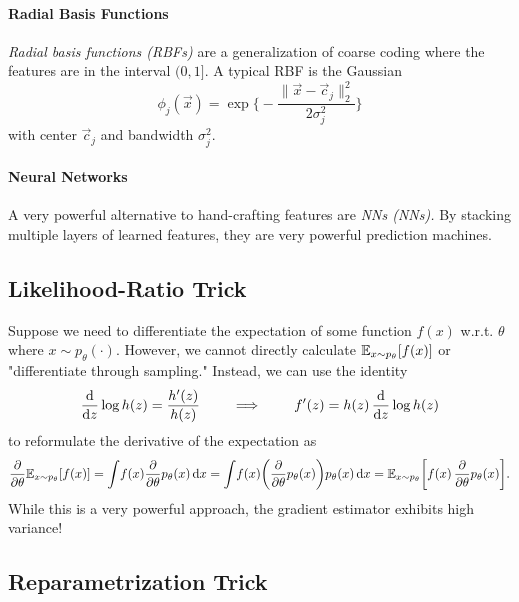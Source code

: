 			\paragraph{Radial Basis Functions}
				\emph{Radial basis functions (\acsp{RBF})} are a generalization of coarse coding where the features are in the interval \((0, 1]\). A typical \ac{RBF} is the Gaussian
				\begin{equation}
					\phi_j(\vec{x}) = \exp\Biggl\{ -\frac{\lVert \vec{x} - \vec{c}_j \rVert_2^2}{2 \sigma_j^2} \Biggr\}
				\end{equation}
				with center \(\vec{c}_j\) and bandwidth \( \sigma_j^2 \).

			\paragraph{Neural Networks}
				A very powerful alternative to hand-crafting features are \emph{\aclp{NN} (\acsp{NN}).} By stacking multiple layers of learned features, they are very powerful prediction machines.

		\subsection{Likelihood-Ratio Trick}
			\label{subsec:likelihoodRatio}

			Suppose we need to differentiate the expectation of some function \( f(x) \) w.r.t. \(\theta\) where \( x \sim p_\theta(\cdot) \). However, we cannot directly calculate \( \mathbb{E}_{x \sim p_\theta}[f(x)] \) or "differentiate through sampling." Instead, we can use the identity
			\begin{equation}
				\dv{z} \log h(z) = \frac{h'(z)}{h(z)}
				\qquad\implies\qquad
				f'(z) = h(z) \, \dv{z} \log h(z)
			\end{equation}
			to reformulate the derivative of the expectation as
			\begin{equation}
				\pdv{\theta} \mathbb{E}_{x \sim p_\theta}[f(x)]
					= \int\! f(x) \pdv{\theta} p_\theta(x) \dd{x}
					= \int\! f(x) \biggl( \pdv{\theta} p_\theta(x) \biggr) p_\theta(x) \dd{x}
					= \mathbb{E}_{x \sim p_\theta} \biggl[ f(x) \, \pdv{\theta} p_\theta(x) \biggr].
			\end{equation}
			While this is a very powerful approach, the gradient estimator exhibits high variance!

		\subsection{Reparametrization Trick}
			\label{subsec:reparam}

